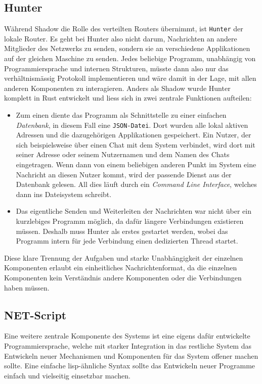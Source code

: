 \documentclass[a4paper,11pt,titlepage,twoside]{memoir}
\begin{document}
\subsection{Hunter}
\label{sec:orgc396fd0}
Während Shadow die Rolle des verteilten Routers übernimmt, ist \texttt{Hunter}
der lokale Router. Es geht bei Hunter also nicht darum, Nachrichten an
andere Mitglieder des Netzwerks zu senden, sondern sie an verschiedene
Applikationen auf der gleichen Maschine zu senden. Jedes beliebige
Programm, unabhängig von Programmiersprache und internen Strukturen,
müsste dann also nur das verhältnismässig Protokoll implementieren und
wäre damit in der Lage, mit allen anderen Komponenten zu interagieren.
Anders als Shadow wurde Hunter komplett in Rust entwickelt und liess
sich in zwei zentrale Funktionen aufteilen:
\begin{itemize}
\item Zum einen diente das Programm als Schnittstelle zu einer einfachen
\emph{Datenbank}, in diesem Fall eine \texttt{JSON-Datei}. Dort wurden alle lokal
aktiven Adressen und die dazugehörigen Applikationen gespeichert.
Ein Nutzer, der sich beispielsweise über einen Chat mit dem System
verbindet, wird dort mit seiner Adresse oder seinem Nutzernamen und
dem Namen des Chats eingetragen. Wenn dann von einem beliebigen
anderen Punkt im System eine Nachricht an diesen Nutzer kommt, wird
der passende Dienst aus der Datenbank gelesen. All dies läuft durch
ein \emph{Command Line Interface}, welches dann ins Dateisystem schreibt.
\item Das eigentliche Senden und Weiterleiten der Nachrichten war nicht
über ein kurzlebiges Programm möglich, da dafür längere Verbindungen
existieren müssen. Deshalb muss Hunter als erstes gestartet werden,
wobei das Programm intern für jede Verbindung einen dedizierten
Thread startet.
\end{itemize}

\noindent Diese klare Trennung der Aufgaben und starke Unabhängigkeit
der einzelnen Komponenten erlaubt ein einheitliches Nachrichtenformat,
da die einzelnen Komponenten kein Verständnis andere Komponenten oder
die Verbindungen haben müssen.
\subsection{NET-Script}
\label{sec:org67fe379}
Eine weitere zentrale Komponente des Systems ist eine eigens dafür
entwickelte Programmiersprache, welche mit starker Integration in das
restliche System das Entwickeln neuer Mechanismen und Komponenten für
das System offener machen sollte. Eine einfache lisp-ähnliche Syntax
sollte das Entwickeln neuer Programme einfach und vielseitig
einsetzbar machen.
\end{document}
